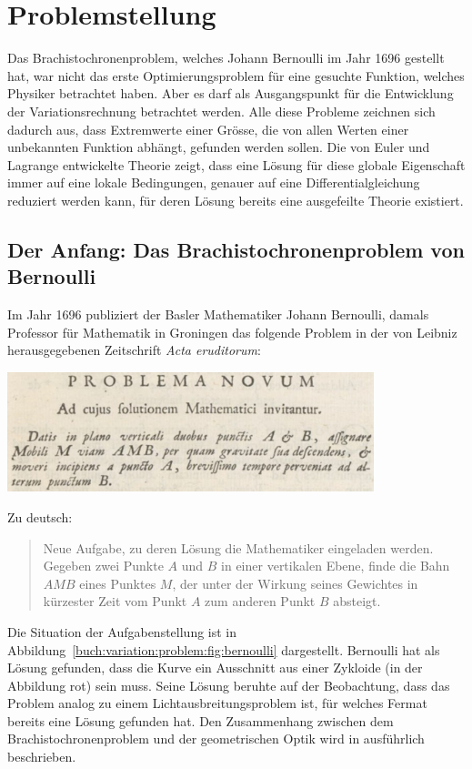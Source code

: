 %
%
%
\section{Problemstellung
\label{buch:variation:section:problemstellung}}
Das Brachistochronenproblem, welches Johann Bernoulli im Jahr 1696
gestellt hat, war nicht das erste Optimierungsproblem für eine 
gesuchte Funktion, welches Physiker betrachtet haben.
Aber es darf als Ausgangspunkt für die Entwicklung der Variationsrechnung
betrachtet werden.
Alle diese Probleme zeichnen sich dadurch aus, dass Extremwerte
einer Grösse, die von allen Werten einer unbekannten Funktion abhängt,
gefunden werden sollen.
Die von Euler und Lagrange entwickelte Theorie zeigt, dass eine
Lösung für diese globale Eigenschaft immer auf eine lokale Bedingungen,
genauer auf eine Differentialgleichung reduziert werden kann, für deren
Lösung bereits eine ausgefeilte Theorie existiert.

%
%
\subsection{Der Anfang: Das Brachistochronenproblem von Bernoulli
\label{buch:variation:problem:subsection:brachistochrone}}
%

Im Jahr 1696 publiziert der Basler Mathematiker Johann Bernoulli, damals
Professor für Mathematik in Groningen das folgende Problem in der
von Leibniz herausgegebenen Zeitschrift {\em Acta eruditorum}:
\begin{center}
\includegraphics[width=0.8\textwidth]{chapters/020-variation/images/latein.jpg}
\end{center}
Zu deutsch:
\begin{quote}
Neue Aufgabe, zu deren Lösung die Mathematiker eingeladen werden.
Gegeben zwei Punkte $A$ und $B$ in einer vertikalen Ebene, finde
die Bahn $AMB$ eines Punktes $M$, der unter der Wirkung seines
Gewichtes in kürzester Zeit vom Punkt $A$ zum anderen Punkt $B$ absteigt.
\end{quote}
Die Situation der Aufgabenstellung ist in
Abbildung~\ref{buch:variation:problem:fig:bernoulli}
dargestellt.
Bernoulli hat als Lösung gefunden, dass die Kurve ein Ausschnitt
aus einer Zykloide (in der Abbildung rot) sein muss.
Seine Lösung beruhte auf der Beobachtung, dass das Problem analog
zu einem Lichtausbreitungsproblem ist, für welches Fermat bereits
eine Lösung gefunden hat.
Den Zusammenhang zwischen dem Brachistochronenproblem und der geometrischen
Optik wird in \cite{buch:broer} ausführlich beschrieben.

